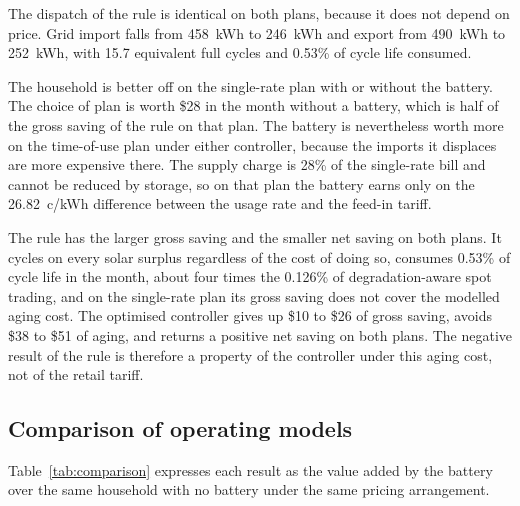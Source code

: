 The dispatch of the rule is identical on both plans, because it does not depend on
price. Grid import falls from 458~kWh to 246~kWh and export from 490~kWh to 252~kWh,
with 15.7 equivalent full cycles and 0.53\% of cycle life consumed.

The household is better off on the single-rate plan with or without the battery. The
choice of plan is worth \$28 in the month without a battery, which is half of the gross
saving of the rule on that plan. The battery is nevertheless worth more on the
time-of-use plan under either controller, because the imports it displaces are more
expensive there. The supply charge is 28\% of the single-rate bill and cannot be reduced
by storage, so on that plan the battery earns only on the 26.82~c/kWh difference between
the usage rate and the feed-in tariff.

The rule has the larger gross saving and the smaller net saving on both plans. It cycles
on every solar surplus regardless of the cost of doing so, consumes 0.53\% of cycle life
in the month, about four times the 0.126\% of degradation-aware spot trading, and on the
single-rate plan its gross saving does not cover the modelled aging cost. The optimised
controller gives up \$10 to \$26 of gross saving, avoids \$38 to \$51 of aging, and
returns a positive net saving on both plans. The negative result of the rule is therefore
a property of the controller under this aging cost, not of the retail tariff.

\subsection{Comparison of operating models}
\label{sec:results:comparison}

Table~\ref{tab:comparison} expresses each result as the value added by the battery over
the same household with no battery under the same pricing arrangement.

